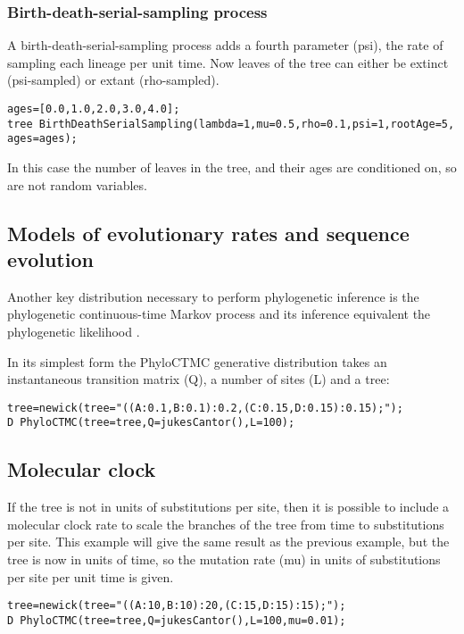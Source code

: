 \documentclass[10pt,letterpaper,table]{article}
\begin{document}
{\subsubsection*{Birth-death-serial-sampling process}

A birth-death-serial-sampling \cite{stadler2013dating} process adds a fourth parameter (psi), the rate of sampling each lineage per unit time.
Now leaves of the tree can either be extinct (psi-sampled) or extant (rho-sampled).

\begin{alltt}
  ages = [0.0,1.0,2.0,3.0,4.0];
  tree ~ BirthDeathSerialSampling(lambda=1, mu=0.5, rho=0.1, psi=1, rootAge=5, ages=ages);
\end{alltt}

In this case the number of leaves in the tree, and their ages are conditioned on, so are not random variables.


\subsection*{Models of evolutionary rates and sequence evolution}

Another key distribution necessary to perform phylogenetic inference
is the phylogenetic continuous-time Markov process and its inference
equivalent the phylogenetic likelihood \cite{felsenstein1981}.

In its simplest form the PhyloCTMC generative
distribution takes an instantaneous transition matrix (Q), a number of sites (L) and a tree:

\begin{alltt}
  tree = newick(tree="((A:0.1,B:0.1):0.2,(C:0.15,D:0.15):0.15);");
  D ~ PhyloCTMC(tree=tree, Q=jukesCantor(), L=100);
\end{alltt}

\subsection*{Molecular clock}

If the tree is not in units of substitutions per site, then it is possible to include a molecular clock rate
to scale the branches of the tree from time to substitutions per site. This example will give the same
result as the previous example, but the tree is now in units of time, so the mutation rate (mu) in units of
substitutions per site per unit time is given.

\begin{alltt}
  tree = newick(tree="((A:10,B:10):20,(C:15,D:15):15);");
  D ~ PhyloCTMC(tree=tree, Q=jukesCantor(), L=100, mu=0.01);
\end{alltt}

}
\end{document}
